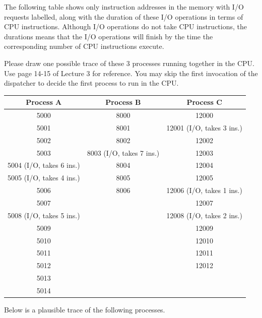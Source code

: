 \documentclass[12pt]{article}
\begin{document}
The following table shows only instruction addresses in the memory with I/O requests labelled, along with the duration of these I/O operations in terms of CPU instructions. Although I/O operations do not take CPU instructions, the durations means that the I/O operations will finish by the time the corresponding number of CPU instructions execute.

Please draw one possible trace of these 3 processes running together in the CPU. Use page 14-15 of Lecture 3 for reference. You may skip the first invocation of the dispatcher to decide the first process to run in the CPU. 

\begin{center}
\begin{tabular}{| c | c | c |}
\hline
{\bf Process A} & {\bf Process B} & {\bf Process C}\\
\hline\hline
5000 & 8000 & 12000\\
\hline
5001 & 8001 & 12001 (I/O, takes 3 ins.)\\
\hline
5002 & 8002 & 12002\\
\hline
5003 & 8003 (I/O, takes 7 ins.) & 12003\\
\hline
5004 (I/O, takes 6 ins.) & 8004 & 12004\\
\hline
5005 (I/O, takes 4 ins.) & 8005 & 12005\\
\hline
5006 & 8006 & 12006 (I/O, takes 1 ins.)\\
\hline
5007 & & 12007\\
\hline
5008 (I/O, takes 5 ins.) & & 12008 (I/O, takes 2 ins.)\\
\hline
5009 & & 12009\\
\hline
5010 & & 12010\\
\hline
5011 & & 12011\\
\hline
5012 & & 12012\\
\hline
5013 & & \\
\hline
5014 & & \\
\hline
\end{tabular}
\end{center}

Below is a plausible trace of the following processes.
\end{document}
